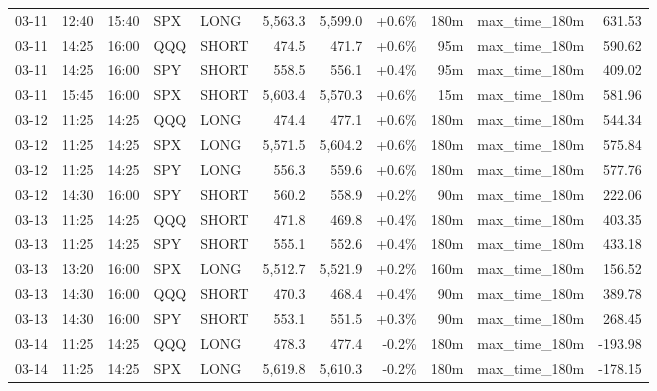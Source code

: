 \documentclass[11pt,a4paper,twoside]{article}
\begin{document}
\begin{center}
\begin{longtable}{>{\color{txtmain}}l l l l l r r r r >{\color{txtmain}}l r}
03-11 & 12:40 & 15:40 & SPX & LONG & 5,563.3 & 5,599.0 & \textcolor{wingreen}{+0.6\%} & 180m & max\_time\_180m & \textcolor{wingreen}{631.53} \\
03-11 & 14:25 & 16:00 & QQQ & SHORT & 474.5 & 471.7 & \textcolor{wingreen}{+0.6\%} & 95m & max\_time\_180m & \textcolor{wingreen}{590.62} \\
03-11 & 14:25 & 16:00 & SPY & SHORT & 558.5 & 556.1 & \textcolor{wingreen}{+0.4\%} & 95m & max\_time\_180m & \textcolor{wingreen}{409.02} \\
03-11 & 15:45 & 16:00 & SPX & SHORT & 5,603.4 & 5,570.3 & \textcolor{wingreen}{+0.6\%} & 15m & max\_time\_180m & \textcolor{wingreen}{581.96} \\
03-12 & 11:25 & 14:25 & QQQ & LONG & 474.4 & 477.1 & \textcolor{wingreen}{+0.6\%} & 180m & max\_time\_180m & \textcolor{wingreen}{544.34} \\
03-12 & 11:25 & 14:25 & SPX & LONG & 5,571.5 & 5,604.2 & \textcolor{wingreen}{+0.6\%} & 180m & max\_time\_180m & \textcolor{wingreen}{575.84} \\
03-12 & 11:25 & 14:25 & SPY & LONG & 556.3 & 559.6 & \textcolor{wingreen}{+0.6\%} & 180m & max\_time\_180m & \textcolor{wingreen}{577.76} \\
03-12 & 14:30 & 16:00 & SPY & SHORT & 560.2 & 558.9 & \textcolor{wingreen}{+0.2\%} & 90m & max\_time\_180m & \textcolor{wingreen}{222.06} \\
03-13 & 11:25 & 14:25 & QQQ & SHORT & 471.8 & 469.8 & \textcolor{wingreen}{+0.4\%} & 180m & max\_time\_180m & \textcolor{wingreen}{403.35} \\
03-13 & 11:25 & 14:25 & SPY & SHORT & 555.1 & 552.6 & \textcolor{wingreen}{+0.4\%} & 180m & max\_time\_180m & \textcolor{wingreen}{433.18} \\
03-13 & 13:20 & 16:00 & SPX & LONG & 5,512.7 & 5,521.9 & \textcolor{wingreen}{+0.2\%} & 160m & max\_time\_180m & \textcolor{wingreen}{156.52} \\
03-13 & 14:30 & 16:00 & QQQ & SHORT & 470.3 & 468.4 & \textcolor{wingreen}{+0.4\%} & 90m & max\_time\_180m & \textcolor{wingreen}{389.78} \\
03-13 & 14:30 & 16:00 & SPY & SHORT & 553.1 & 551.5 & \textcolor{wingreen}{+0.3\%} & 90m & max\_time\_180m & \textcolor{wingreen}{268.45} \\
03-14 & 11:25 & 14:25 & QQQ & LONG & 478.3 & 477.4 & \textcolor{lossred}{-0.2\%} & 180m & max\_time\_180m & \textcolor{lossred}{-193.98} \\
03-14 & 11:25 & 14:25 & SPX & LONG & 5,619.8 & 5,610.3 & \textcolor{lossred}{-0.2\%} & 180m & max\_time\_180m & \textcolor{lossred}{-178.15} \\

\end{longtable}
\end{center}
\end{document}
